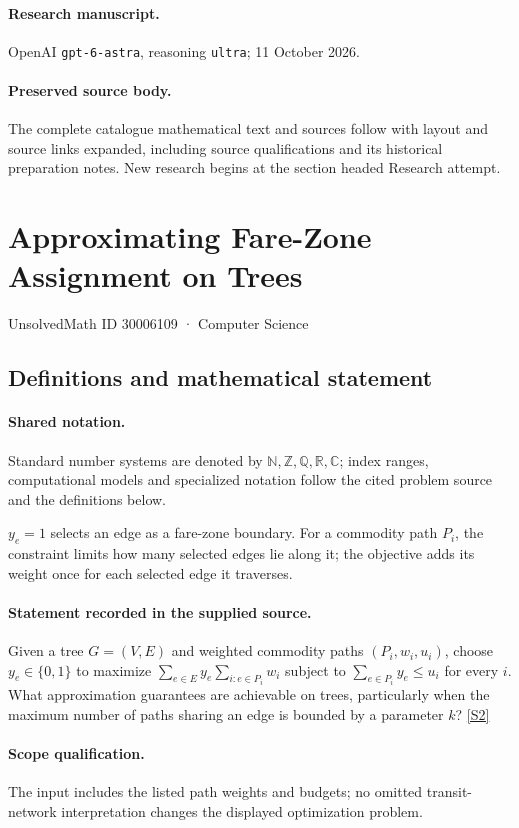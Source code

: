 \documentclass[11pt]{article}
\begin{document}
\paragraph{Research manuscript.} OpenAI \texttt{gpt-6-astra}, reasoning \texttt{ultra}; 11 October 2026.
\paragraph{Preserved source body.} The complete catalogue mathematical text and sources follow with layout and source links expanded, including source qualifications and its historical preparation notes. New research begins at the section headed Research attempt.

\section{Approximating Fare-Zone Assignment on Trees}\label{30006109}
{\small UnsolvedMath ID 30006109 · Computer Science}
\subsection{Definitions and mathematical statement}

\paragraph{Shared notation.}Standard number systems are denoted by $\mathbb N,\mathbb Z,\mathbb Q,\mathbb R,\mathbb C$; index ranges, computational models and specialized notation follow the cited problem source and the definitions below.


$y_e=1$ selects an edge as a fare-zone boundary. For a commodity path $P_i$, the constraint limits how many selected edges lie along it; the objective adds its weight once for each selected edge it traverses.
\paragraph{Statement recorded in the supplied source.}
Given a tree $G=(V,E)$ and weighted commodity paths $(P_i,w_i,u_i)$, choose $y_e\in\{0,1\}$ to maximize $\sum_{e\in E}y_e\sum_{i:e\in P_i}w_i$ subject to $\sum_{e\in P_i}y_e\leq u_i$ for every $i$. What approximation guarantees are achievable on trees, particularly when the maximum number of paths sharing an edge is bounded by a parameter $k$? \href{https://doi.org/10.4171/owr/2024/50}{[S2]}
\paragraph{Scope qualification.}
The input includes the listed path weights and budgets; no omitted transit-network interpretation changes the displayed optimization problem.
\end{document}

